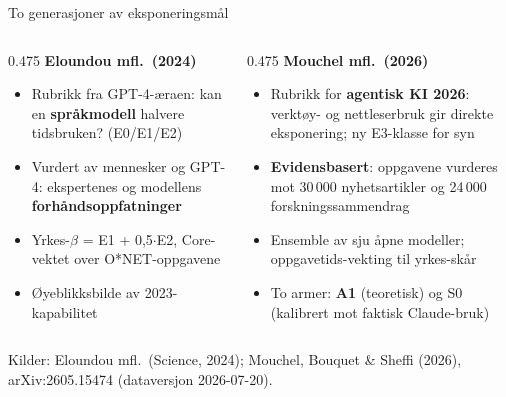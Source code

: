 
\begin{frame}{To generasjoner av eksponeringsmål}
\begin{columns}[T,onlytextwidth]
\begin{column}{0.475\textwidth}
  {\bfseries\textcolor{illBlue}{Eloundou mfl.\ (2024)}}

  \vspace{0.25em}
  {\footnotesize
  \begin{itemize}\setlength\itemsep{0.25em}
    \item Rubrikk fra GPT-4-æraen: kan en \textbf{språkmodell} halvere tidsbruken? (E0/E1/E2)
    \item Vurdert av mennesker og GPT-4: ekspertenes og modellens \textbf{forhåndsoppfatninger}
    \item Yrkes-$\beta$ = E1 + 0{,}5$\cdot$E2, Core-vektet over O*NET-oppgavene
    \item Øyeblikksbilde av 2023-kapabilitet
  \end{itemize}}
\end{column}
\begin{column}{0.475\textwidth}
  {\bfseries\textcolor{illTeal}{Mouchel mfl.\ (2026)}}

  \vspace{0.25em}
  {\footnotesize
  \begin{itemize}\setlength\itemsep{0.25em}
    \item Rubrikk for \textbf{agentisk KI 2026}: verktøy- og nettleserbruk gir direkte eksponering; ny E3-klasse for syn
    \item \textbf{Evidensbasert}: oppgavene vurderes mot 30\,000 nyhetsartikler og 24\,000 forskningssammendrag
    \item Ensemble av sju åpne modeller; oppgavetids-vekting til yrkes-skår
    \item To armer: \textbf{A1} (teoretisk) og S0 (kalibrert mot faktisk Claude-bruk)
  \end{itemize}}
\end{column}
\end{columns}

\vspace{0.25em}

\vspace{0.05em}
\raggedright\tiny\textcolor{illGray}{Kilder: Eloundou mfl.\ (Science, 2024); Mouchel, Bouquet \& Sheffi (2026), arXiv:2605.15474 (dataversjon 2026-07-20).}
\end{frame}

